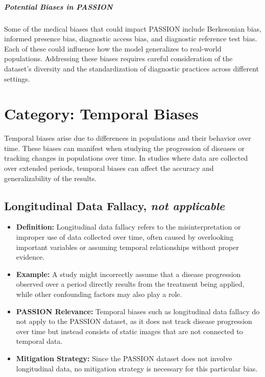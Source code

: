 \begin{refsection}
		\subparagraph{Potential Biases in PASSION}
		Some of the medical biases that could impact PASSION include Berkesonian bias, informed presence bias, diagnostic access bias, and diagnostic reference test bias. Each of these could influence how the model generalizes to real-world populations. Addressing these biases requires careful consideration of the dataset’s diversity and the standardization of diagnostic practices across different settings.
		
		
		\section{\textbf{Category:} Temporal Biases}
		Temporal biases arise due to differences in populations and their behavior over time. These biases can manifest when studying the progression of diseases or tracking changes in populations over time. In studies where data are collected over extended periods, temporal biases can affect the accuracy and generalizability of the results.
		
		\subsection{Longitudinal Data Fallacy, \textit{not applicable}}
		\begin{itemize}
			\item \textbf{Definition:} Longitudinal data fallacy refers to the misinterpretation or improper use of data collected over time, often caused by overlooking important variables or assuming temporal relationships without proper evidence.
			\item \textbf{Example:} A study might incorrectly assume that a disease progression observed over a period directly results from the treatment being applied, while other confounding factors may also play a role.
			\item \textbf{PASSION Relevance:} Temporal biases such as longitudinal data fallacy do not apply to the PASSION dataset, as it does not track disease progression over time but instead consists of static images that are not connected to temporal data.
			\item \textbf{Mitigation Strategy:} Since the PASSION dataset does not involve longitudinal data, no mitigation strategy is necessary for this particular bias.
		\end{itemize}

\end{refsection}
